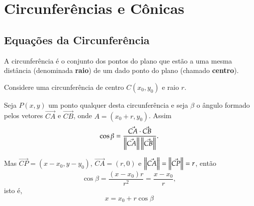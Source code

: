 
\chapter{Circunfer\^encias e C\^onicas} %
\label{cha:circunferencias_e_conicas}

\section{Equa\c{c}\~oes da Circunfer\^encia} %
\label{sec:equacoes_da_circunferencias}

\begin{definicao}
  A circunfer\^encia \'e o conjunto dos pontos do plano que est\~ao a uma mesma dist\^ancia (denominada \textbf{raio}) de um dado ponto do plano (chamado \textbf{centro}).
\end{definicao}

Considere uma circunfer\^encia de centro $C(x_0,y_0)$ e raio $r$.
\begin{figure}[h]
  \centering
\end{figure}
Seja $P(x,y)$ um ponto qualquer desta circunfer\^encia e seja $\beta$ o \^angulo formado pelos vetores $\vec{CA}$ e $\vec{CB}$, onde $A = (x_0 + r, y_0)$. Assim
\[
  \cos\beta = \dfrac{\vec{CA}\cdot\vec{CB}}{\left\lVert\vec{CA}\right\rVert\left\Vert{\vec{CB}}\right\Vert}.
\]

Mas $\vec{CP} = (x - x_0, y - y_0)$, $\vec{CA} = (r, 0)$ e $\left\Vert{\vec{CA}}\right\Vert = \left\Vert{\vec{CP}}\right\Vert = r$, ent\~ao
\[
  \cos\beta = \dfrac{(x - x_0)r}{r^2} = \dfrac{x - x_0}{r},
\]
isto \'e,
\begin{equation}\label{equacaoparametricaX}
  x = x_0 + r\cos\beta
\end{equation}

